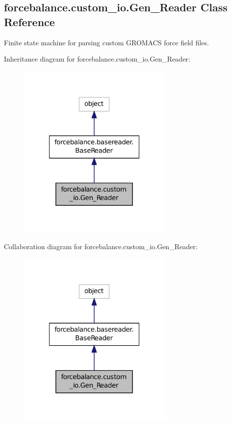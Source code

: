 \hypertarget{classforcebalance_1_1custom__io_1_1Gen__Reader}{\subsection{forcebalance.\-custom\-\_\-io.\-Gen\-\_\-\-Reader Class Reference}
\label{classforcebalance_1_1custom__io_1_1Gen__Reader}
}


Finite state machine for parsing custom G\-R\-O\-M\-A\-C\-S force field files.  




Inheritance diagram for forcebalance.\-custom\-\_\-io.\-Gen\-\_\-\-Reader\-:
\nopagebreak
\begin{figure}[H]
\begin{center}
\leavevmode
\includegraphics[width=216pt]{classforcebalance_1_1custom__io_1_1Gen__Reader__inherit__graph}
\end{center}
\end{figure}


Collaboration diagram for forcebalance.\-custom\-\_\-io.\-Gen\-\_\-\-Reader\-:
\nopagebreak
\begin{figure}[H]
\begin{center}
\leavevmode
\includegraphics[width=216pt]{classforcebalance_1_1custom__io_1_1Gen__Reader__coll__graph}
\end{center}
\end{figure}
